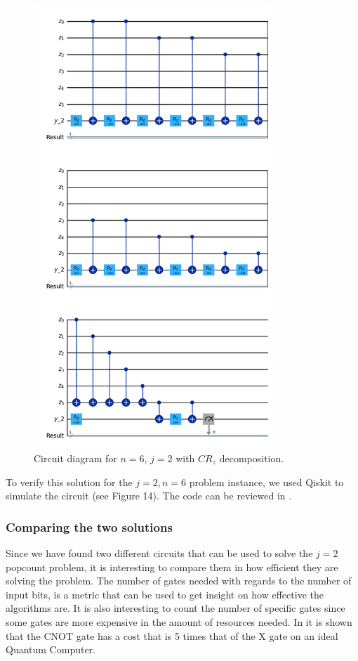 \documentclass[12pt,a4paper]{article}
\begin{document}
\begin{figure}[htbp] 
    \centering \includegraphics[width=0.8\textwidth]{Figures/QFT_decomposed_solution_n=6.png} 
    \caption{Circuit diagram for \(n=6\), \(j=2\) with \(CR_z\) decomposition.} 
    \label{fig:qft_crz_circuit_drawing} 
\end{figure}   

To verify this solution for the \(j=2, n=6\) problem instance, we used Qiskit to simulate the circuit (see Figure 14). The code can be reviewed in .


\subsubsection{Comparing the two solutions}

Since we have found two different circuits that can be used to solve the \(j=2\) popcount problem, it is interesting to compare them in how efficient they are solving the problem. The number of gates needed with regards to the number of input bits, is a metric that can be used to get insight on how effective the algorithms are. It is also interesting to count the number of specific gates since some gates are more expensive in the amount of resources needed. In \cite{lee_cost_2006} it is shown that the CNOT gate has a cost that is 5 times that of the X gate on an ideal Quantum Computer. 
\end{document}
